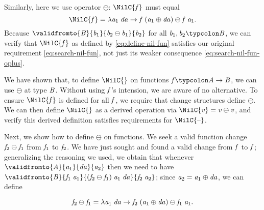 Similarly, here we use operator \ensuremath{\ominus }: \ensuremath{\NilC{\Varid{f}}} must equal
\begin{equation}
  \label{eq:define-nil-fun}
\ensuremath{\NilC{\Varid{f}}\mathrel{=}\lambda \Varid{a}_{1}\;\Varid{da}\to \Varid{f}\;(\Varid{a}_{1}\oplus \Varid{da})\ominus \Varid{f}\;\Varid{a}_{1}}.
\end{equation}
Because \ensuremath{\validfromto{\Conid{B}}{\Varid{b}_{1}}{\Varid{b}_{2}\ominus \Varid{b}_{1}}{\Varid{b}_{2}}} for all \ensuremath{\Varid{b}_{1},\Varid{b}_{2}\typcolon\Conid{B}}, we can verify
that \ensuremath{\NilC{\Varid{f}}} as defined by \cref{eq:define-nil-fun} satisfies our original
requirement \cref{eq:search-nil-fun}, not just its weaker consequence
\cref{eq:search-nil-fun-oplus}.

We have shown that, to define \ensuremath{\NilC{}} on functions \ensuremath{\Varid{f}\typcolon\Conid{A}\to \Conid{B}},
we can use \ensuremath{\ominus } at type \ensuremath{\Conid{B}}. Without using \ensuremath{\Varid{f}}'s intension,
we are aware of no alternative. To ensure \ensuremath{\NilC{\Varid{f}}} is defined for
all \ensuremath{\Varid{f}}, we require that change structures define \ensuremath{\ominus }. We
can then define \ensuremath{\NilC{}} as a derived operation via \ensuremath{\NilC{\Varid{v}}\mathrel{=}\Varid{v}\ominus \Varid{v}}, and verify this derived definition satisfies
requirements for \ensuremath{\NilC{\text{\textendash}}}.

Next, we show how to define \ensuremath{\ominus } on functions. We seek a
valid function change \ensuremath{\Varid{f}_{2}\ominus \Varid{f}_{1}} from \ensuremath{\Varid{f}_{1}} to \ensuremath{\Varid{f}_{2}}. We have
just sought and found a valid change from \ensuremath{\Varid{f}} to \ensuremath{\Varid{f}};
generalizing the reasoning we used, we obtain that whenever
\ensuremath{\validfromto{\Conid{A}}{\Varid{a}_{1}}{\Varid{da}}{\Varid{a}_{2}}} then we need to have \ensuremath{\validfromto{\Conid{B}}{\Varid{f}_{1}\;\Varid{a}_{1}}{(\Varid{f}_{2}\ominus \Varid{f}_{1})\;\Varid{a}_{1}\;\Varid{da}}{\Varid{f}_{2}\;\Varid{a}_{2}}}; since \ensuremath{\Varid{a}_{2}\mathrel{=}\Varid{a}_{1}\oplus \Varid{da}}, we can
define

\begin{equation}
  \label{eq:ominus-fun-1}
\mathit{f}_{2}\ominus \mathit{f}_{1}\mathrel{=}\lambda \mathit{a}_{1}\;\mathit{da}\to \mathit{f}_{2}\;(\mathit{a}_{1}\oplus \mathit{da})\ominus \mathit{f}_{1}\;\mathit{a}_{1}.
\end{equation}

